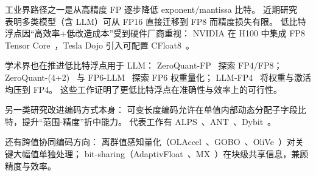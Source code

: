 \begin{table}[htbp!]
\centering
{}
\caption{浮点、均匀量化与非均匀量化对比}
\label{tab:data_format_comparison}
\end{table}

工业界路径之一是从高精度 FP 逐步降低 exponent/mantissa 比特。
近期研究~\citep{micikevicius2022fp8,sun2019hybrid} 表明多类模型（含 LLM）可从 FP16 直接迁移到 FP8 而精度损失有限。
低比特浮点因“高效率+低改造成本”受到硬件厂商重视：
NVIDIA 在 H100 中集成 FP8 Tensor Core~\citep{nvidiahopperarchitecture}，Tesla Dojo 引入可配置 CFloat8~\citep{tesladojotechnology}。

学术界也在推进低比特浮点用于 LLM：
ZeroQuant-FP~\citep{wu2023zeroquant} 探索 FP4/FP8；
ZeroQuant-(4+2)~\citep{wu2023zeroquant1} 与 FP6-LLM~\citep{xia2024fp6} 探索 FP6 权重量化；
LLM-FP4~\citep{liu2023llm} 将权重与激活均压到 FP4。
这些工作证明了更低比特浮点在准确性与效率上的可行性。

另一类研究改进编码方式本身：
可变长度编码允许在单值内部动态分配子字段比特，提升“范围-精度”折中能力。
代表工作有 ALPS~\citep{langroudi2021alps}、ANT~\citep{guo2022ant}、Dybit~\citep{zhou2023dybit}。

还有跨值协同编码方向：
离群值感知量化（OLAccel~\citep{park2018energy}、GOBO~\citep{zadeh2020gobo}、OliVe~\citep{guo2023olive}）对关键大幅值单独处理；
bit-sharing（AdaptivFloat~\citep{tambe2020algorithm}、MX~\citep{darvish2023shared}）在块级共享信息，兼顾精度与效率。


